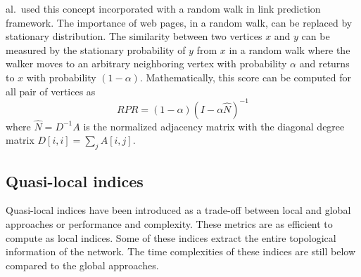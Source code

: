 \begin{itemize}
          al.~used this concept incorporated with a random walk in link prediction
          framework. The importance of web pages, in a random walk, can be
          replaced by stationary distribution. The similarity between two vertices
          \(x\) and \(y\) can be measured by the stationary probability of \(y\)
          from \(x\) in a random walk where the walker moves to an arbitrary
          neighboring vertex with probability \(\alpha\) and returns to \(x\) with
          probability \((1 - \alpha)\). Mathematically, this score can be computed
          for all pair of vertices as
          \[RPR = (1 - \alpha)(I - \alpha \hat{N})^{-1}\] where
          \(\hat{N} = D^{-1} A\) is the normalized adjacency matrix with the
          diagonal degree matrix \(D[i, i] = \sum_j A[i, j]\).
\end{itemize}

\subsection{Quasi-local indices}

Quasi-local indices have been introduced as a trade-off between local
and global approaches or performance and complexity. These metrics are
as efficient to compute as local indices. Some of these indices extract
the entire topological information of the network. The time complexities
of these indices are still below compared to the global approaches.

